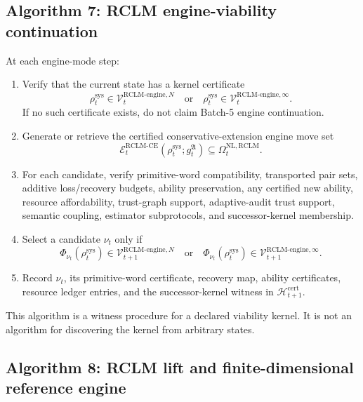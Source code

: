 \documentclass[11pt,a4paper]{article}
\newcommand{\Vcal}{\mathcal V}
\newcommand{\RCLM}{\mathrm{RCLM}}
\newcommand{\sys}{\mathrm{sys}}
\newcommand{\cert}{\mathrm{cert}}
\newcommand{\engine}{\mathrm{engine}}
\newcommand{\NL}{\mathrm{NL}}
\newcommand{\CE}{\mathrm{CE}}
\begin{document}
\subsection*{Algorithm 7: RCLM engine-viability continuation}

At each engine-mode step:
\begin{enumerate}[leftmargin=1.5em]
    \item Verify that the current state has a kernel certificate
    \[
    \rho_t^{\sys}\in\Vcal_t^{\RCLM\text{-}\engine,N}
    \quad\text{or}\quad
    \rho_t^{\sys}\in\Vcal_t^{\RCLM\text{-}\engine,\infty}.
    \]
    If no such certificate exists, do not claim Batch-5 engine continuation.
    \item Generate or retrieve the certified conservative-extension engine move set
    \[
    \mathcal E_t^{\RCLM\text{-}\CE}(\rho_t^{\sys};g_t^{\mathfrak A})
    \subseteq
    \Omega_t^{\NL,\RCLM}.
    \]
    \item For each candidate, verify primitive-word compatibility, transported pair sets, additive loss/recovery budgets, ability preservation, any certified new ability, resource affordability, trust-graph support, adaptive-audit trust support, semantic coupling, estimator subprotocols, and successor-kernel membership.
    \item Select a candidate \(\nu_t\) only if
    \[
    \Phi_{\nu_t}(\rho_t^{\sys})\in\Vcal_{t+1}^{\RCLM\text{-}\engine,N}
    \quad\text{or}\quad
    \Phi_{\nu_t}(\rho_t^{\sys})\in\Vcal_{t+1}^{\RCLM\text{-}\engine,\infty}.
    \]
    \item Record \(\nu_t\), its primitive-word certificate, recovery map, ability certificates, resource ledger entries, and the successor-kernel witness in \(\mathcal H_{t+1}^{\cert}\).
\end{enumerate}

This algorithm is a witness procedure for a declared viability kernel.  It is not an algorithm for discovering the kernel from arbitrary states.



\subsection*{Algorithm 8: RCLM lift and finite-dimensional reference engine}
\end{document}
